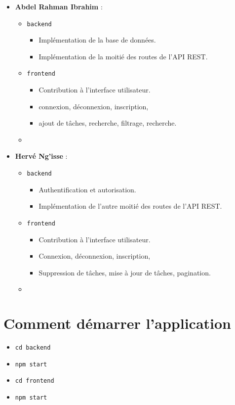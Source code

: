 \documentclass[a4paper,12pt]{article}
\begin{document}
\begin{itemize}
    \item \textbf{Abdel Rahman Ibrahim} : 
    \begin{itemize}
        \item \texttt{backend}
            \begin{itemize}
                \item Implémentation de la base de données.
                \item Implémentation de la moitié des routes de l'API REST.
            \end{itemize}
        \item \texttt{frontend}
            \begin{itemize}
                \item Contribution à l'interface utilisateur.
                \item connexion, déconnexion, inscription, 
                \item ajout de tâches, recherche, filtrage, recherche.
            \end{itemize}
        \item 
        
    \end{itemize}
    \item \textbf{Hervé Ng'isse} : 
    \begin{itemize}
        \item \texttt{backend}
            \begin{itemize}
                \item Authentification et autorisation.
                \item Implémentation de l'autre moitié des routes de l'API REST.
            \end{itemize}
        \item \texttt{frontend}
            \begin{itemize}
                \item Contribution à l'interface utilisateur.
                \item Connexion, déconnexion, inscription, 
                \item Suppression de tâches, mise à jour de tâches, pagination.
            \end{itemize}
        \item 
        \end{itemize}
\end{itemize}

\section{Comment démarrer l'application}

\begin{itemize}
    \item \texttt{cd backend}
    \item \texttt{npm start}
    \item \texttt{cd frontend}
    \item \texttt{npm start}
\end{itemize}
\end{document}
